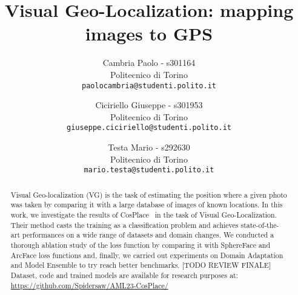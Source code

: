 \documentclass[10pt,twocolumn,letterpaper]{article}
\begin{document}
\title{Visual Geo-Localization:
mapping images to GPS}

\author{Cambria Paolo - s301164\\
Politecnico di Torino\\
{\tt\small paolocambria@studenti.polito.it}
\and
Ciciriello Giuseppe - s301953\\
Politecnico di Torino\\
{\tt\small giuseppe.ciciriello@studenti.polito.it}
\and
Testa Mario - s292630\\
Politecnico di Torino\\
{\tt\small mario.testa@studenti.polito.it}
}

\maketitle

\begin{abstract}
Visual Geo-localization (VG) is the task of estimating the position where a given photo was taken by comparing it with a large database of images of known locations.
In this work, we investigate the results of CosPlace~\cite{Berton_CVPR_2022_CosPlace} in the task of Visual Geo-Localization. Their method casts the training as a classification problem and achieves state-of-the-art performances on a wide range of datasets and domain changes. We conducted a thorough ablation study of the loss function by comparing it with SphereFace and ArcFace loss functions and, finally, we carried out experiments on Domain Adaptation and Model Ensemble to try reach better benchmarks.
[TODO REVIEW FINALE]
Dataset, code and trained models are available for research purposes at: \newline
\url{https://github.com/Spidersaw/AML23-CosPlace/}
\end{abstract}



\end{document}
